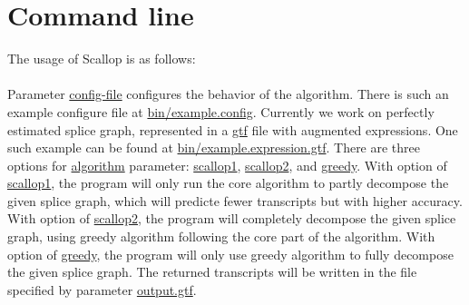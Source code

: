 \documentclass{llncs}
\begin{document}
\section{Command line}
The usage of Scallop is as follows:\\
\\
Parameter \url{config-file} configures the behavior of the algorithm.
There is such an example configure file at \url{bin/example.config}.
Currently we work on perfectly estimated splice graph, represented in a \url{gtf} file with
augmented expressions. One such example can be found at \url{bin/example.expression.gtf}.
There are three options for \url{algorithm} parameter: \url{scallop1}, \url{scallop2}, and \url{greedy}.
With option of \url{scallop1}, the program will only run the core algorithm to partly
decompose the given splice graph, which will predicte fewer transcripts but with
higher accuracy. With option of \url{scallop2}, the program will completely
decompose the given splice graph, using greedy algorithm following the core part of the algorithm.
With option of \url{greedy}, the program will only use greedy algorithm to fully decompose
the given splice graph.
The returned transcripts will be written in the file specified by parameter \url{output.gtf}.

\end{document}
